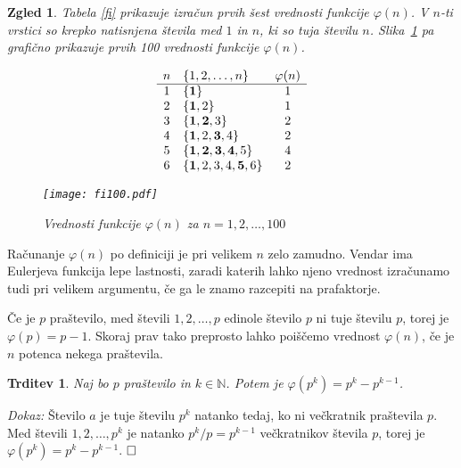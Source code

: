 \documentclass[a4paper,12pt]{article}
\def\N{\mathbb{N}} %
\def\qed{$\hfill\Box$}   %
\newtheorem{trditev}{Trditev}
\newtheorem{zgled}{Zgled}
\begin{document}
\begin{zgled}
Tabela \ref{fi} prikazuje izračun prvih šest vrednosti funkcije $\varphi(n)$. V $n$-ti vrstici so 
krepko natisnjena števila med $1$ in $n$, ki so tuja številu $n$. Slika~\ref{fi100} pa grafično prikazuje prvih 100 vrednosti funkcije $\varphi(n)$.
\begin{table}[h]
\[
\begin{array}{clc}
 n & \{1,2,\ldots, n\}          & \varphi(n)       \\
 \hline
 1 & \{{\bf 1}\}                    &     1      \\
 2 & \{{\bf 1},2 \}                &     1      \\
 3 & \{{\bf 1,2},3 \}             &     2      \\
 4 & \{{\bf 1},2,{\bf 3},4 \} &     2      \\
 5 & \{{\bf 1,2,3,4},5 \}       &     4      \\
 6 & \{{\bf 1},2,3,4,{\bf 5},6 \} &     2
\end{array}
\] 
\caption{Vrednosti funkcije $\varphi(n)$ za $n = 1,2,\ldots,6$}\label{fi}
\end{table}

\begin{figure}[h]
\texttt{[image: fi100.pdf]}
\caption{Vrednosti funkcije $\varphi(n)$ za $n = 1,2,\ldots,100$}\label{fi100}
\end{figure}
\end{zgled}

Računanje $\varphi(n)$ po definiciji je pri velikem $n$ zelo zamudno. Vendar ima 
Eulerjeva funkcija lepe lastnosti, zaradi katerih lahko njeno vrednost izračunamo
tudi pri velikem argumentu, če ga le znamo razcepiti na prafaktorje.

Če je $p$ praštevilo, med števili $1,2,\ldots, p$ edinole število $p$ ni tuje številu $p$,
torej je $\varphi(p) = p-1$. Skoraj prav tako preprosto lahko poiščemo vrednost $\varphi(n)$,
če je $n$ potenca nekega praštevila.

\begin{trditev}
\label{fipp}
Naj bo $p$ praštevilo in $k \in \N$. Potem je $\varphi(p^k) = p^k-p^{k-1}$.
\end{trditev}

\noindent
{\em Dokaz:\/} Število $a$ je tuje številu $p^k$ natanko tedaj, ko ni večkratnik praštevila $p$.
Med števili $1,2,\ldots, p^k$ je natanko $p^k/p = p^{k-1}$ večkratnikov števila $p$, torej je $\varphi(p^k) = p^k-p^{k-1}$. 
\qed
\end{document}
